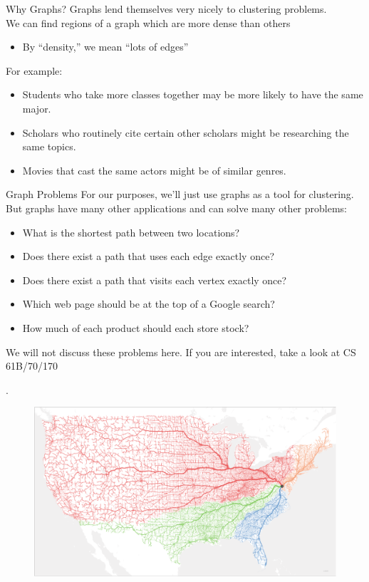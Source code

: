 \documentclass[aspectratio=169]{../latex_main/tntbeamer}  %
\begin{document}
	
	\begin{frame}{Why Graphs?}
	    Graphs lend themselves very nicely to clustering problems.\\
        We can find regions of a graph which are more dense than others
        \begin{itemize}
            \item By “density,” we mean “lots of edges”
        \end{itemize}
       \bigskip
       For example:
       \begin{itemize}
           \item Students who take more classes together may be more likely to have the same major.
           \item Scholars who routinely cite certain other scholars might be researching the same topics.
           \item Movies that cast the same actors might be of similar genres.
       \end{itemize}
       
	\end{frame}
	
	
	
	
	\begin{frame}{Graph Problems}
	    For our purposes, we’ll just use graphs as a tool for clustering.\\
        But graphs have many other applications and can solve many other problems:
        \begin{itemize}
            \item What is the shortest path between two locations?
            \item Does there exist a path that uses each edge exactly once?
            \item Does there exist a path that visits each vertex exactly once?
            \item Which web page should be at the top of a Google search?
            \item How much of each product should each store stock?
        \end{itemize}
        \bigskip
        We will not discuss these problems here. If you are interested, take a look at CS 61B/70/170
	\end{frame}
	
	
	
	\begin{frame}{.}
	     \begin{figure}
	         \centering
	         \includegraphics[scale=.485]{Bild10}
	     \end{figure}
	\end{frame}
 
\end{document}
